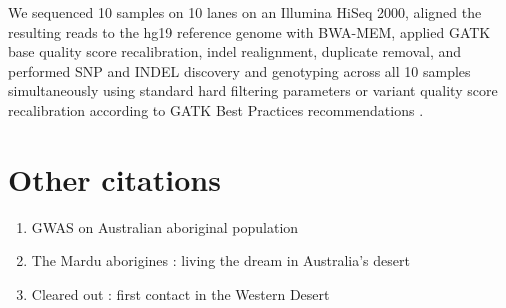 \documentclass[a4paper, 10pt]{article}
\begin{document}
We sequenced 10 samples on 10 lanes on an Illumina HiSeq 2000, aligned the resulting reads to the hg19 reference genome with BWA-MEM\cite{bwamem}, applied GATK\cite{pmid20644199} base quality score recalibration, indel realignment, duplicate removal, and performed SNP and INDEL discovery and genotyping across all 10 samples simultaneously using standard hard filtering parameters or variant quality score recalibration according to GATK Best Practices recommendations \cite{pmid21478889, pmid25431634}.

\section{Other citations}

\begin{enumerate}

   \item GWAS on Australian aboriginal population \cite{pmid25760438}
   \item The Mardu aborigines : living the dream in Australia's desert\cite{tonkinson2002}
   \item Cleared out : first contact in the Western Desert\cite{davenport2005}

\end{enumerate}


\end{document}
